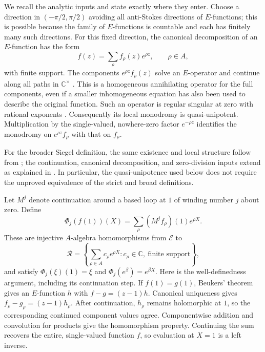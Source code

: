 \documentclass[11pt,a4paper]{article}
\numberwithin{equation}{section}
\theoremstyle{definition}
\theoremstyle{remark}
\begin{document}
We recall the analytic inputs and state exactly where they enter.
Choose a direction in $(-\pi/2,\pi/2)$ avoiding all anti-Stokes
directions of $E$-functions; this is possible because the family of
$E$-functions is countable and each has finitely many such directions.
For this fixed direction, the canonical decomposition
of an $E$-function has the form
\[
 f(z)=\sum_\rho f_\rho(z)e^{\rho z},\qquad \rho\in A,
\]
with finite support.  The components $e^{\rho z}f_\rho(z)$ solve an
$E$-operator and continue along all paths in $\mathbb C^\times$
\cite[Theorem~2.3 and the paragraph preceding it]{FR2026}.
This is a homogeneous annihilating operator for the full components,
even if a smaller inhomogeneous equation has also been used to
describe the original function.  Such an operator is regular singular
at zero with rational exponents
\cite[\S3.2, proof of Proposition~3, p.~41]{FR2016}.  Consequently its
local monodromy is quasi-unipotent.  Multiplication by the
single-valued, nowhere-zero factor $e^{-\rho z}$ identifies the
monodromy on $e^{\rho z}f_\rho$ with that on $f_\rho$.

For the broader Siegel definition, the same existence and local
structure follow from \cite[Proposition~16 and Theorem~7(a,b,d)]{Lepetit2021};
the continuation, canonical decomposition, and zero-division inputs
extend as explained in \cite[pp.~3--4]{FR2026}.  In particular, the
quasi-unipotence used below does not require the unproved equivalence
of the strict and broad definitions.

Let $M^j$ denote continuation around a based loop at $1$ of winding
number $j$ about zero.  Define
\[
 \Phi_j(f(1))(X)=\sum_\rho (M^j f_\rho)(1)e^{\rho X}.
\]
These are injective $A$-algebra homomorphisms from $\mathcal E$ to
\[
 \mathcal R=\left\{\sum_{\rho\in A}c_\rho e^{\rho X}:
                 c_\rho\in\mathbb C,\ \text{finite support}\right\},
\]
and satisfy $\Phi_j(\xi)(1)=\xi$ and
$\Phi_j(e^\beta)=e^{\beta X}$.
Here is the well-definedness argument, including its continuation
step.  If $f(1)=g(1)$, Beukers' theorem \cite{Beukers2006} gives an
$E$-function $h$ with $f-g=(z-1)h$.  Canonical uniqueness gives
$f_\rho-g_\rho=(z-1)h_\rho$.  After continuation, $h_\rho$ remains
holomorphic at $1$, so the corresponding continued component values
agree.  Componentwise addition and convolution for products give the
homomorphism property.  Continuing the sum recovers the entire,
single-valued function $f$, so evaluation at $X=1$ is a left inverse.
\end{document}
